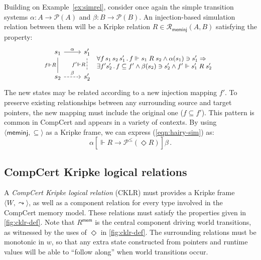 \documentclass[sigplan,10pt,review]{acmart}
\newcommand{\figsize}{\small}
\newcommand{\kw}[1]{\ensuremath{ \mathsf{#1} }}
\newcommand{\ifr}[1]{\mathrel{[{#1}]}}
\begin{document}
\begin{example} \label{ex:sim} %
Building on Example~\ref{ex:simrel},
consider once again the simple transition systems
$\alpha : A \rightarrow \mathcal{P}(A)$ and
$\beta : B \rightarrow \mathcal{P}(B)$.
An injection-based simulation relation between them
will be a Kripke relation
$R \in \mathcal{R}_\kw{meminj}(A, B)$
satisfying the property:
\begin{equation} \label{eqn:hairy-sim}
  \hspace{-1ex}
  \begin{tikzcd}[scale=0.8]
    s_1 \arrow[r, "\alpha"]
        \arrow[d, dash, "f \Vdash R"'] &
    s_1' \arrow[d, dashed, dash, "f' \Vdash R"'] \\ %
    s_2 \arrow[r, dashed, "\beta"] &
    s_2'
  \end{tikzcd}
  \figsize
    \begin{array}{l}
    \forall f \, s_1 \, s_2 \, s_1' \,.\,
      f \Vdash s_1 \mathrel{R} s_2 \wedge
      \alpha(s_1) \ni s_1' \Rightarrow \\
    \exists f' s_2' \,.\,
      f \subseteq f' \wedge
      \beta(s_2) \ni s_2' \wedge
      f' \Vdash s_1' \mathrel{R} s_2'
    \end{array}
\end{equation}
The new states may be related according to
a new injection mapping $f'$.
To preserve existing relationships
between any surrounding source and target pointers,
the new mapping must include
the original one ($f \subseteq f'$).
This pattern is common in CompCert
and appears in a variety of contexts.
By using $\langle \kw{meminj}, {\subseteq} \rangle$
as a Kripke frame,
we can express
(\ref{eqn:hairy-sim}) as:
\[
  \alpha \ifr{\Vdash R \rightarrow \mathcal{P}^\le(\Diamond R)} \beta \,.
\]
\end{example}


\subsection{CompCert Kripke logical relations} \label{sec:cklrdef} %

A \emph{CompCert Kripke logical relation} (CKLR)
must provides a Kripke frame $\langle W, {\leadsto} \rangle$,
as well as a component relation for every type involved
in the CompCert memory model.
These relations must satisfy
the properties given in \autoref{fig:cklr-def}.
Note that $R^\kw{mem}$
is the central component driving world transitions,
as witnessed by the uses of $\Diamond$ in \autoref{fig:cklr-def}.
The surrounding relations must be monotonic in $w$,
so that any extra state
constructed from pointers and runtime values
will be able to ``follow along'' when
world transitions occur.
\end{document}
